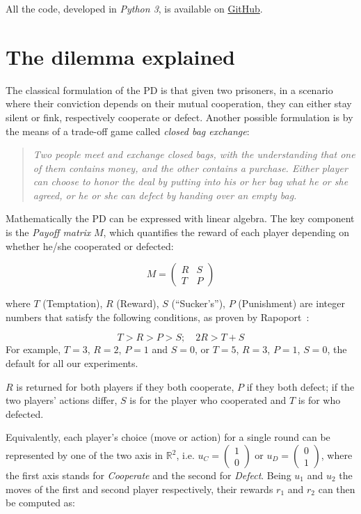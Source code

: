 \documentclass[journal,a4paper,10pt,twoside]{IEEEtran} %
\begin{document}
All the code, developed in \textit{Python 3}, is available on \href{https://github.com/eliabntt/LaboratoryOfComputationalPhysics/tree/Group9}{GitHub}.

\section{The dilemma explained} \label{s:game}
The classical formulation of the PD is that given two prisoners, in a scenario where their conviction depends on their mutual cooperation, they can either stay silent or fink, respectively cooperate or defect.
Another possible formulation is by the means of a trade-off game called \textit{closed bag exchange}:

\begin{quote}
\textit{Two people meet and exchange closed bags, with the understanding that one of them contains money, and the other contains a purchase. Either player can choose to honor the deal by putting into his or her bag what he or she agreed, or he or she can defect by handing over an empty bag.}
\end{quote}

Mathematically the PD can be expressed with linear algebra. The key component is the \textit{Payoff matrix} $M$, which quantifies the reward of each player depending on whether he/she cooperated or defected:

$$
M = 
\begin{pmatrix} 
R & S \\
T & P 
\end{pmatrix}
$$

where $T$ (Temptation), $R$ (Reward), $S$ (``Sucker's''), $P$ (Punishment) are integer numbers that satisfy the following conditions, as proven by Rapoport~\cite{rapoport}:

$$
T>R>P>S; \quad 2R > T+S 
$$
For example, $T=3$, $R=2$, $P=1$ and $S=0$, or  $T=5$, $R=3$, $P=1$, $S=0$, the default for all our experiments.

$R$ is returned for both players if they both cooperate, $P$ if they both defect; if the two players' actions differ, $S$ is for the player who cooperated and $T$ is for who defected.

Equivalently, each player's choice (move or action) for a single round can be represented by one of the two axis in $\mathbb{R}^2$, i.e. $u_C=\begin{pmatrix} 1 \\ 0 \end{pmatrix}$ or $u_D=\begin{pmatrix} 0 \\ 1 \end{pmatrix}$, where the first axis stands for \textit{Cooperate} and the second for \textit{Defect}. Being $u_1$ and $u_2$ the moves of the first and second player respectively, their rewards $r_1$ and $r_2$ can then be computed as:
\end{document}
